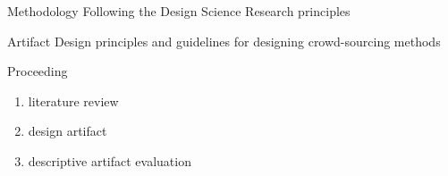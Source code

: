\documentclass{beamer}
\begin{document}
\begin{frame}{Methodology}
	Following the Design Science Research principles
	\begin{block}{Artifact}
		Design principles and guidelines for designing crowd-sourcing methods
	\end{block}
	\begin{block}{Proceeding}
		\begin{enumerate}[]
			\item literature review
			\item design artifact
			\item descriptive artifact evaluation
		\end{enumerate}
	\end{block}
\end{frame}
\end{document}
